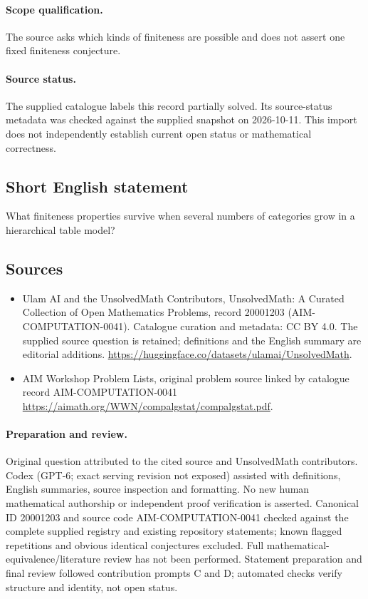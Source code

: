 \documentclass[11pt]{article}
\begin{document}
\paragraph{Scope qualification.}
The source asks which kinds of finiteness are possible and does not assert one fixed finiteness conjecture.
\paragraph{Source status.}
The supplied catalogue labels this record partially solved. Its source-status metadata was checked against the supplied snapshot on 2026-10-11. This import does not independently establish current open status or mathematical correctness.
\subsection{Short English statement}
What finiteness properties survive when several numbers of categories grow in a hierarchical table model?
\subsection{Sources}
\begin{itemize}
\item[S1] Ulam AI and the UnsolvedMath Contributors, UnsolvedMath: A Curated Collection of Open Mathematics Problems, record 20001203 (AIM-COMPUTATION-0041). Catalogue curation and metadata: CC BY 4.0. The supplied source question is retained; definitions and the English summary are editorial additions.
\url{https://huggingface.co/datasets/ulamai/UnsolvedMath}.
\item[S2] AIM Workshop Problem Lists, original problem source linked by catalogue record AIM-COMPUTATION-0041
\url{https://aimath.org/WWN/compalgstat/compalgstat.pdf}.
\end{itemize}
\paragraph{Preparation and review.}
Original question attributed to the cited source and UnsolvedMath contributors. Codex (GPT-6; exact serving revision not exposed) assisted with definitions, English summaries, source inspection and formatting. No new human mathematical authorship or independent proof verification is asserted. Canonical ID 20001203 and source code AIM-COMPUTATION-0041 checked against the complete supplied registry and existing repository statements; known flagged repetitions and obvious identical conjectures excluded. Full mathematical-equivalence/literature review has not been performed. Statement preparation and final review followed contribution prompts C and D; automated checks verify structure and identity, not open status.
\label{end:20001203}
\end{document}
